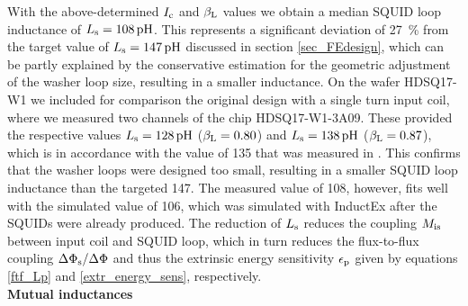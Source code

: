 With the above-determined $I_{\rm c}$ and $\beta_{\rm L}$ values we obtain a median SQUID loop inductance of  $L_{\rm s}=\qty{108}{\pico\henry}$. This represents a significant deviation of \qty{27}{\percent} from the target value of $L_{\rm s}=\qty{147}{\pico\henry}$ discussed in section \ref{sec_FEdesign}, which can be partly explained by the conservative estimation for the geometric adjustment of the washer loop size, resulting in a smaller inductance. On the wafer HDSQ17-W1 we included for comparison the original design \cite{Bauer2022} with a single turn input coil, where we measured two channels of the chip HDSQ17-W1-3A09. These provided the respective values $L_{\rm s}=\qty{128}{\pico\henry}$ ($\beta_{\rm L}=0.80$) and $L_{\rm s}=\qty{138}{\pico\henry}$ ($\beta_{\rm L}=0.87$), which is in accordance with the value of \qty{135}{\pH} that was measured in \cite{Bauer2022}. This confirms that the washer loops were designed too small, resulting in a smaller SQUID loop inductance than the targeted \qty{147}{\pH}. The measured value of \qty{108}{\pH}, however, fits well with the simulated value of \qty{106}{\pH}, which was simulated with InductEx after the SQUIDs were already produced. The reduction of $L_{\rm s}$ reduces the coupling $M_{\rm is}$ between input coil and SQUID loop, which in turn reduces the flux-to-flux coupling $\Delta\Phi_{\rm s}/\Delta\Phi$ and thus the extrinsic energy sensitivity $\epsilon_{\rm p}$ given by equations \ref{ftf_Lp} and \ref{extr_energy_sens}, respectively. \\
 
{\large{\textbf{Mutual inductances}}}\\ 
 

